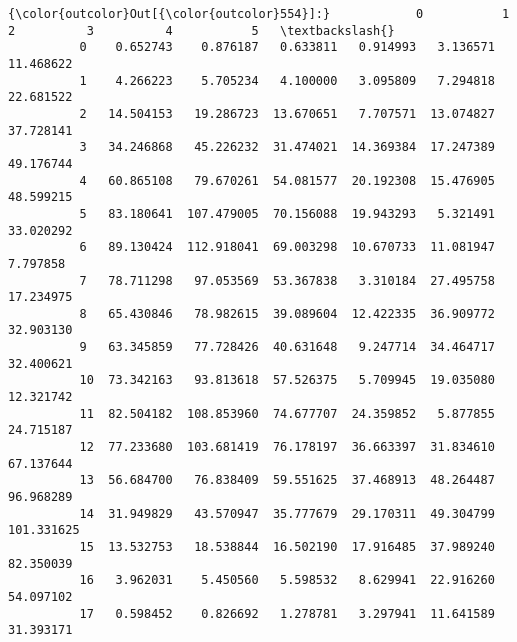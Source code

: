 \documentclass[11pt]{article}
\begin{document}
\begin{Verbatim}[commandchars=\\\{\}]
{\color{outcolor}Out[{\color{outcolor}554}]:}            0           1          2          3          4           5   \textbackslash{}
          0    0.652743    0.876187   0.633811   0.914993   3.136571   11.468622   
          1    4.266223    5.705234   4.100000   3.095809   7.294818   22.681522   
          2   14.504153   19.286723  13.670651   7.707571  13.074827   37.728141   
          3   34.246868   45.226232  31.474021  14.369384  17.247389   49.176744   
          4   60.865108   79.670261  54.081577  20.192308  15.476905   48.599215   
          5   83.180641  107.479005  70.156088  19.943293   5.321491   33.020292   
          6   89.130424  112.918041  69.003298  10.670733  11.081947    7.797858   
          7   78.711298   97.053569  53.367838   3.310184  27.495758   17.234975   
          8   65.430846   78.982615  39.089604  12.422335  36.909772   32.903130   
          9   63.345859   77.728426  40.631648   9.247714  34.464717   32.400621   
          10  73.342163   93.813618  57.526375   5.709945  19.035080   12.321742   
          11  82.504182  108.853960  74.677707  24.359852   5.877855   24.715187   
          12  77.233680  103.681419  76.178197  36.663397  31.834610   67.137644   
          13  56.684700   76.838409  59.551625  37.468913  48.264487   96.968289   
          14  31.949829   43.570947  35.777679  29.170311  49.304799  101.331625   
          15  13.532753   18.538844  16.502190  17.916485  37.989240   82.350039   
          16   3.962031    5.450560   5.598532   8.629941  22.916260   54.097102   
          17   0.598452    0.826692   1.278781   3.297941  11.641589   31.393171   
          

\end{Verbatim}
\end{document}
